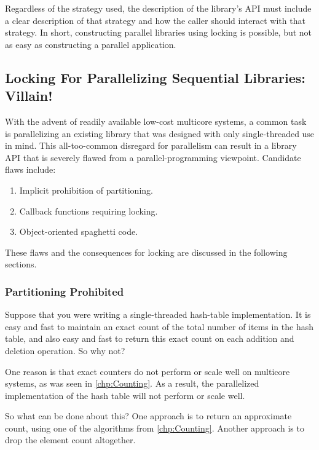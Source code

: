 Regardless of the strategy used, the description of the library's API
must include a clear description of that strategy and how the caller
should interact with that strategy.
In short, constructing parallel libraries using locking is possible,
but not as easy as constructing a parallel application.

\subsection{Locking For Parallelizing Sequential Libraries:
							    Villain!}
\label{sec:locking:Locking For Parallelizing Sequential Libraries: Villain!}

With the advent of readily available low-cost multicore systems,
a common task is parallelizing an existing library that was designed
with only single-threaded use in mind.
This all-too-common disregard for parallelism can result in a library
API that is severely flawed from a parallel-programming viewpoint.
Candidate flaws include:

\begin{enumerate}
\item	Implicit prohibition of partitioning.
\item	Callback functions requiring locking.
\item	Object-oriented spaghetti code.
\end{enumerate}

These flaws and the consequences for locking are discussed in the following
sections.

\subsubsection{Partitioning Prohibited}
\label{sec:locking:Partitioning Prohibited}

Suppose that you were writing a single-threaded hash-table implementation.
It is easy and fast to maintain an exact count of the total number of items
in the hash table, and also easy and fast to return this exact count on each
addition and deletion operation.
So why not?

One reason is that exact counters do not perform or scale well on
multicore systems, as was
seen in \cref{chp:Counting}.
As a result, the parallelized implementation of the hash table will not
perform or scale well.

So what can be done about this?
One approach is to return an approximate count, using one of the algorithms
from \cref{chp:Counting}.
Another approach is to drop the element count altogether.

